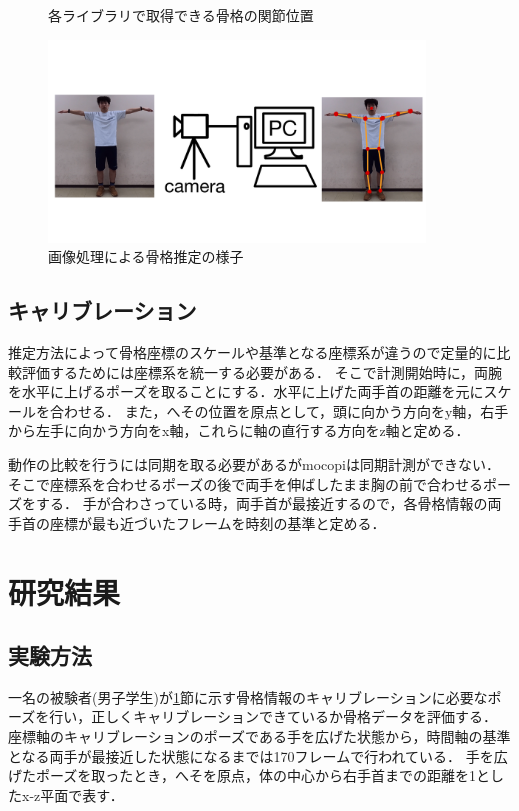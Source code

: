 \documentclass[a4j, fleqn, 12pt]{jsreport}
\begin{document}
\begin{figure}[t]
\begin{minipage}[]{0.45\hsize}
    \label{RGBD}
  \end{minipage}
  \caption{各ライブラリで取得できる骨格の関節位置}
  \label{sokutei}
\end{figure}
\begin{figure}[b]
  \centering
  \includegraphics[width=10cm]{img/image_3D.png}
  \caption{画像処理による骨格推定の様子}
  \label{image_3D}
\end{figure}
\section{キャリブレーション}\label{kyari}
推定方法によって骨格座標のスケールや基準となる座標系が違うので定量的に比較評価するためには座標系を統一する必要がある．
そこで計測開始時に，両腕を水平に上げるポーズを取ることにする．水平に上げた両手首の距離を元にスケールを合わせる．
また，へその位置を原点として，頭に向かう方向をy軸，右手から左手に向かう方向をx軸，これらに軸の直行する方向をz軸と定める．

動作の比較を行うには同期を取る必要があるがmocopiは同期計測ができない．
そこで座標系を合わせるポーズの後で両手を伸ばしたまま胸の前で合わせるポーズをする．
手が合わさっている時，両手首が最接近するので，各骨格情報の両手首の座標が最も近づいたフレームを時刻の基準と定める．

\chapter{研究結果}
\section{実験方法}
一名の被験者(男子学生)が\ref{kyari}節に示す骨格情報のキャリブレーションに必要なポーズを行い，正しくキャリブレーションできているか骨格データを評価する．
座標軸のキャリブレーションのポーズである手を広げた状態から，時間軸の基準となる両手が最接近した状態になるまでは170フレームで行われている．
手を広げたポーズを取ったとき，へそを原点，体の中心から右手首までの距離を1としたx-z平面で表す．
\end{document}
